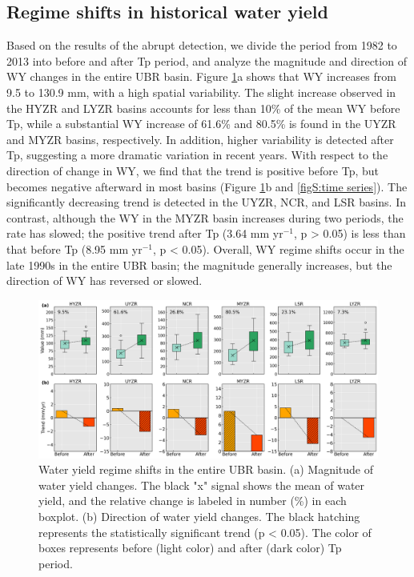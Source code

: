 \documentclass[hess, manuscript]{copernicus}
\begin{document}
\subsection{Regime shifts in historical water yield}
Based on the results of the abrupt detection, we divide the period from 1982 to 2013 into before and after Tp period, and analyze the magnitude and direction of WY changes in the entire UBR basin. Figure \ref{fig:magnitude-direction}a shows that WY increases from 9.5 to 130.9 mm, with a high spatial variability. The slight increase observed in the HYZR and LYZR basins accounts for less than 10\% of the mean WY before Tp, while a substantial WY increase of 61.6\% and 80.5\% is found in the UYZR and MYZR basins, respectively. In addition, higher variability is detected after Tp, suggesting a more dramatic variation in recent years. 
With respect to the direction of change in WY, we find that the trend is positive before Tp, but becomes negative afterward in most basins (Figure \ref{fig:magnitude-direction}b and \ref{figS:time series}). The significantly decreasing trend is detected in the UYZR, NCR, and LSR basins. In contrast, although the WY in the MYZR basin increases during two periods, the rate has slowed; the positive trend after Tp (3.64 mm yr$^{−1}$, p > 0.05) is less than that before Tp (8.95 mm yr$^{−1}$, p < 0.05). Overall, WY regime shifts occur in the late 1990s in the entire UBR basin; the magnitude generally increases, but the direction of WY has reversed or slowed.

\begin{figure}[ht]
    \includegraphics[width=\textwidth]{02-figures/magnitude_and_direction.png}
    \caption
    {Water yield regime shifts in the entire UBR basin. (a) Magnitude of water yield changes. The black "x" signal shows the mean of water yield, and the relative change is labeled in number (\%) in each boxplot. (b) Direction of water yield changes. The black hatching represents the statistically significant trend (p < 0.05). The color of boxes represents before (light color) and after (dark color) Tp period.}
    \label{fig:magnitude-direction}
\end{figure}
\end{document}
